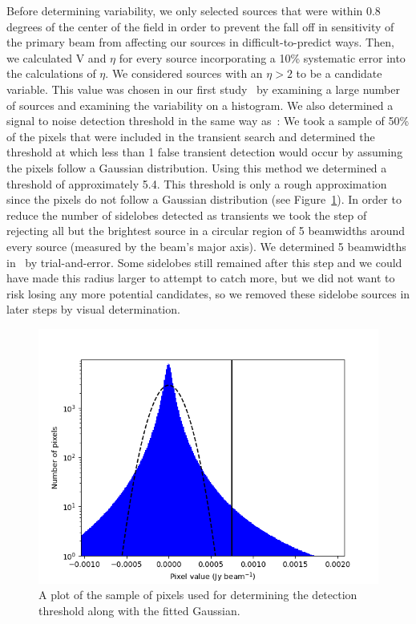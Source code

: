 \documentclass[12pt]{article}
\begin{document}
Before determining variability, we only selected sources that were within 0.8 degrees of the center of the field in order to prevent the fall off in sensitivity of the primary beam from affecting our sources in difficult-to-predict ways. Then, we calculated V and $\eta$ for every source incorporating a 10\%  systematic error into the calculations of $\eta$. We considered sources with an $\eta > 2$ to be a candidate variable. This value was chosen in our first study~\citet{commensal1} by examining a large number of sources and examining the variability on a histogram.  We also determined a signal to noise detection threshold in the same way as~\citet{commensal1}: We took a sample of 50\% of the pixels that were included in the transient search and determined the threshold at which less than 1 false transient detection would occur by assuming the pixels follow a Gaussian distribution. Using this method we determined a threshold of approximately 5.4. This threshold is only a rough approximation since the pixels do not follow a Gaussian distribution (see Figure~\ref{fig:pixels}). In order to reduce the number of sidelobes detected as transients we took the step of rejecting all but the brightest source in a circular region of 5 beamwidths around every source (measured by the beam's major axis). We determined 5 beamwidths in~\citet{commensal1} by trial-and-error. Some sidelobes still remained after this step and we could have made this radius larger to attempt to catch more, but we did not want to risk losing any more potential candidates, so we removed these sidelobe sources in later steps by visual determination.
\begin{figure}
	\includegraphics[width=\columnwidth]{pixels.png}
	\caption{A plot of the sample of pixels used for determining the detection threshold along with the fitted Gaussian.}
	\label{fig:pixels}
\end{figure}
\end{document}
